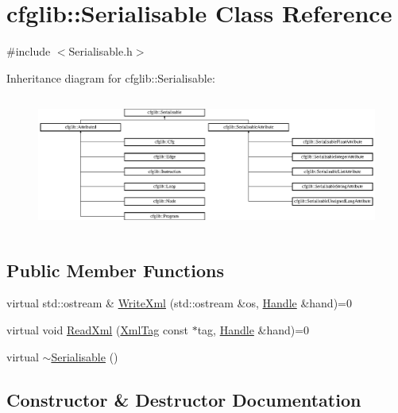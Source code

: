 \hypertarget{classcfglib_1_1Serialisable}{}\section{cfglib\+:\+:Serialisable Class Reference}
\label{classcfglib_1_1Serialisable}


{\ttfamily \#include $<$Serialisable.\+h$>$}

Inheritance diagram for cfglib\+:\+:Serialisable\+:\begin{figure}[H]
\begin{center}
\leavevmode
\includegraphics[height=4.480000cm]{classcfglib_1_1Serialisable}
\end{center}
\end{figure}
\subsection*{Public Member Functions}
\begin{DoxyCompactItemize}
\item 
virtual std\+::ostream \& \hyperlink{classcfglib_1_1Serialisable_aaeb80cc7397ad312e5ae34f39412ce42}{Write\+Xml} (std\+::ostream \&os, \hyperlink{classcfglib_1_1Handle}{Handle} \&hand)=0
\item 
virtual void \hyperlink{classcfglib_1_1Serialisable_a876d530446317872259356af9b016e13}{Read\+Xml} (\hyperlink{classXmlTag}{Xml\+Tag} const $\ast$tag, \hyperlink{classcfglib_1_1Handle}{Handle} \&hand)=0
\item 
virtual \hyperlink{classcfglib_1_1Serialisable_a778fac708aa3f3c1063fcadef60590ee}{$\sim$\+Serialisable} ()
\end{DoxyCompactItemize}


\subsection{Constructor \& Destructor Documentation}
\mbox{\label{classcfglib_1_1Serialisable_a778fac708aa3f3c1063fcadef60590ee}} 

